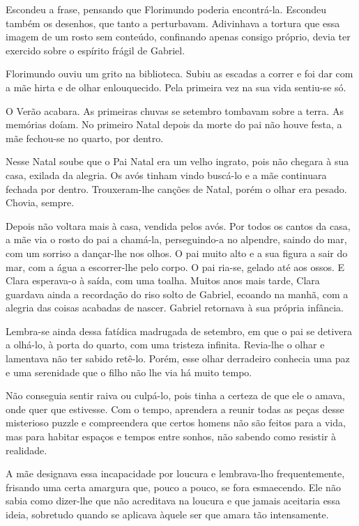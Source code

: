 Escondeu a frase, pensando que Florimundo poderia encontrá-la. Escondeu
também os desenhos, que tanto a perturbavam. Adivinhava a tortura que
essa imagem de um rosto sem conteúdo, confinando apenas consigo próprio,
devia ter exercido sobre o espírito frágil de Gabriel.

Florimundo ouviu um grito na biblioteca. Subiu as escadas a correr e foi
dar com a mãe hirta e de olhar enlouquecido. Pela primeira vez na sua
vida sentiu-se só.

O Verão acabara. As primeiras chuvas se setembro tombavam sobre a terra.
As memórias doíam. No primeiro Natal depois da morte do pai não houve
festa, a mãe fechou-se no quarto, por dentro.

Nesse Natal soube que o Pai Natal era um velho ingrato, pois não chegara
à sua casa, exilada da alegria. Os avós tinham vindo buscá-lo e a mãe
continuara fechada por dentro. Trouxeram-lhe canções de Natal, porém o
olhar era pesado. Chovia, sempre.

Depois não voltara mais à casa, vendida pelos avós. Por todos os cantos
da casa, a mãe via o rosto do pai a chamá-la, perseguindo-a no alpendre,
saindo do mar, com um sorriso a dançar-lhe nos olhos. O pai muito alto e
a sua figura a sair do mar, com a água a escorrer-lhe pelo corpo. O pai
ria-se, gelado até aos ossos. E Clara esperava-o à saída, com uma
toalha. Muitos anos mais tarde, Clara guardava ainda a recordação do
riso solto de Gabriel, ecoando na manhã, com a alegria das coisas
acabadas de nascer. Gabriel retornava à sua própria infância.

Lembra-se ainda dessa fatídica madrugada de setembro, em que o pai se
detivera a olhá-lo, à porta do quarto, com uma tristeza infinita.
Revia-lhe o olhar e lamentava não ter sabido retê-lo. Porém, esse olhar
derradeiro conhecia uma paz e uma serenidade que o filho não lhe via há
muito tempo.

Não conseguia sentir raiva ou culpá-lo, pois tinha a certeza de que ele
o amava, onde quer que estivesse. Com o tempo, aprendera a reunir todas
as peças desse misterioso puzzle e compreendera que certos homens não
são feitos para a vida, mas para habitar espaços e tempos entre sonhos,
não sabendo como resistir à realidade.

A mãe designava essa incapacidade por loucura e lembrava-lho
frequentemente, frisando uma certa amargura que, pouco a pouco, se fora
esmaecendo. Ele não sabia como dizer-lhe que não acreditava na loucura e
que jamais aceitaria essa ideia, sobretudo quando se aplicava àquele ser
que amara tão intensamente.

